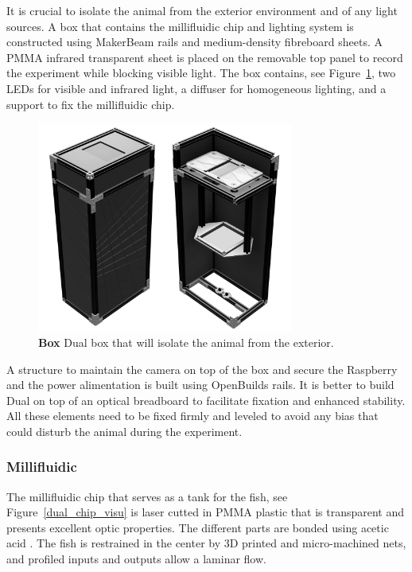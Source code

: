   It is crucial to isolate the animal from the exterior environment and of any light sources. A box that contains the millifluidic chip and lighting system is constructed using MakerBeam rails and medium-density fibreboard sheets. A PMMA infrared transparent sheet is placed on the removable top panel to record the experiment while blocking visible light. The box contains, see Figure~\ref{dual_box}, two LEDs for visible and infrared light, a diffuser for homogeneous lighting, and a support to fix the millifluidic chip.

    \begin{figure}[h!]
      \centering
      \includegraphics[width=0.75\textwidth]{part_2/assets/box.png}
      \caption{\textbf{Box} Dual box that will isolate the animal from the exterior.}
      \label{dual_box}
    \end{figure}

  A structure to maintain the camera on top of the box and secure the Raspberry and the power alimentation is built using OpenBuilds rails. It is better to build Dual on top of an optical breadboard to facilitate fixation and enhanced stability. All these elements need to be fixed firmly and leveled to avoid any bias that could disturb the animal during the experiment.

  \subsubsection{Millifluidic}
  The millifluidic chip that serves as a tank for the fish, see Figure~\ref{dual_chip_visu} is laser cutted in PMMA plastic that is transparent and presents excellent optic properties. The different parts are bonded using acetic acid \cite{trinh2019clog}. The fish is restrained in the center by 3D printed and micro-machined nets, and profiled inputs and outputs allow a laminar flow.


